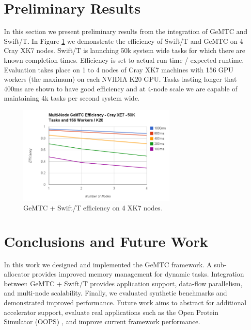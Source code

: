 \documentclass[conference]{IEEEtran}
\begin{document}
\section{Preliminary Results}
In this section we present preliminary results from the integration of GeMTC and Swift/T. In Figure \ref{fig:multinode} we demonstrate the efficiency of Swift/T and GeMTC on 4 Cray XK7 nodes. Swift/T is launching 50k system wide tasks for which there are known completion times. Efficiency is set to actual run time / expected runtime. Evaluation takes place on 1 to 4 nodes of Cray XK7 machines with 156 GPU workers (the maximum) on each NVIDIA K20 GPU. Tasks lasting longer that 400ms are shown to have good efficiency and at 4-node scale we are capable of maintaining 4k tasks per second system wide.


\begin{figure}[h]
\centering\includegraphics[width=8cm]{imgs/multinode.png}
\caption{GeMTC + Swift/T efficiency on 4 XK7 nodes.}
\label{fig:multinode}
\end{figure}


\section{Conclusions and Future Work}
In this work we designed and implemented the GeMTC framework. A sub-allocator provides improved memory management for dynamic tasks. Integration between GeMTC + Swift/T provides application support, data-flow parallelism, and multi-node scalability. Finally, we evaluated synthetic benchmarks and demonstrated improved performance. Future work aims to abstract for additional accelerator support, evaluate real applications such as the Open Protein Simulator (OOPS) \cite{OOPS}, and improve current framework performance.



\end{document}
